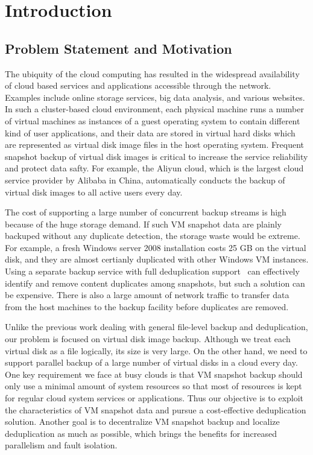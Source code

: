 \chapter{Introduction}
\label{chap:intro}
\section{Problem Statement and Motivation}
\label{intro:prob}
The  ubiquity  of the cloud computing  has  resulted  in  the 
widespread availability of cloud based services and applications accessible through 
the network. Examples include online storage services, big data analysis, and various websites.
In such a cluster-based cloud environment,
each physical machine runs a number of virtual machines as  instances of a guest operating system 
to contain different kind of user applications,
and their data are stored in virtual hard disks which are represented 
as virtual disk image files in the host operating system.
Frequent snapshot backup of virtual disk images is critical to increase  the service reliability
and protect data safty.
For example, the Aliyun cloud, which is  the largest cloud service provider by Alibaba in China, 
automatically conducts  the backup of virtual disk images to all active users every day.

The cost of supporting a large number of concurrent backup streams is high
because of the huge storage demand. 
If such VM snapshot data are plainly backuped without any duplicate detection, the storage waste would be 
extreme. For example, a fresh Windows server 2008 installation costs 25 GB on the virtual  disk,
and they are almost certianly duplicated with other Windows VM instances.
Using a separate  backup service with full deduplication support~\cite{venti02,bottleneck08}
can effectively identify and remove content duplicates among snapshots, 
but such a solution can be expensive. There is also a large amount of 
network traffic to transfer  data from the host machines to the backup facility
before duplicates are removed.

Unlike the previous work dealing with general file-level
backup and deduplication, our problem is focused on virtual
disk image backup. Although we treat each virtual disk as a
file logically, its size is very large. On the other hand, we need
to support parallel backup of a large number of virtual disks
in a cloud every day. One key requirement we face at busy clouds
 is that VM snapshot backup should only use a minimal
amount of system resources so that most of resources is kept
for regular cloud system services or applications. Thus our
objective is to exploit the characteristics of VM snapshot data
and pursue a cost-effective deduplication solution. Another
goal is to decentralize VM snapshot backup and localize
deduplication as much as possible, which brings the benefits
for increased parallelism and fault isolation.

